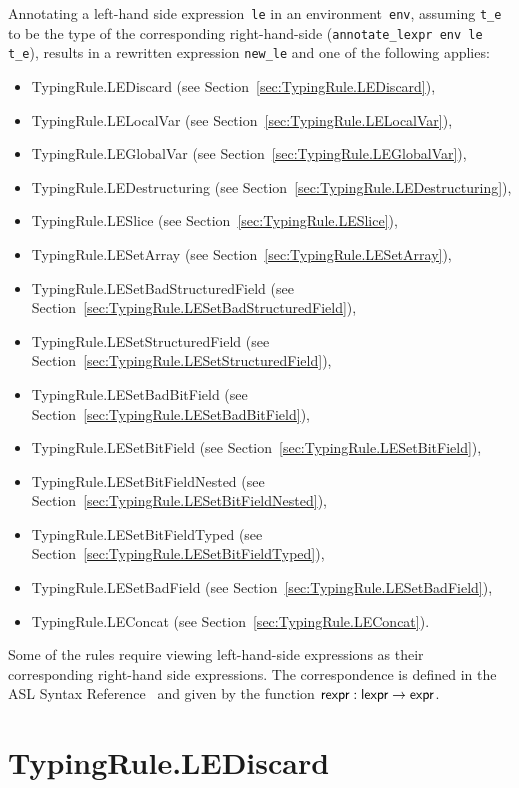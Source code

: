 \documentclass{book}
\begin{document}
Annotating a left-hand side expression~\texttt{le} in an environment~\texttt{env}, assuming \texttt{t\_e}
to be the type of the corresponding right-hand-side (\texttt{annotate\_lexpr env le t\_e}),
results in a rewritten expression \texttt{new\_le} and one of the following applies:
\begin{itemize}
\item TypingRule.LEDiscard (see Section~\ref{sec:TypingRule.LEDiscard}),
\item TypingRule.LELocalVar (see Section~\ref{sec:TypingRule.LELocalVar}),
\item TypingRule.LEGlobalVar (see Section~\ref{sec:TypingRule.LEGlobalVar}),
\item TypingRule.LEDestructuring (see Section~\ref{sec:TypingRule.LEDestructuring}),
\item TypingRule.LESlice (see Section~\ref{sec:TypingRule.LESlice}),
\item TypingRule.LESetArray (see Section~\ref{sec:TypingRule.LESetArray}),
\item TypingRule.LESetBadStructuredField (see Section~\ref{sec:TypingRule.LESetBadStructuredField}),
\item TypingRule.LESetStructuredField (see Section~\ref{sec:TypingRule.LESetStructuredField}),
\item TypingRule.LESetBadBitField (see Section~\ref{sec:TypingRule.LESetBadBitField}),
\item TypingRule.LESetBitField (see Section~\ref{sec:TypingRule.LESetBitField}),
\item TypingRule.LESetBitFieldNested (see Section~\ref{sec:TypingRule.LESetBitFieldNested}),
\item TypingRule.LESetBitFieldTyped (see Section~\ref{sec:TypingRule.LESetBitFieldTyped}),
\item TypingRule.LESetBadField (see Section~\ref{sec:TypingRule.LESetBadField}),
\item TypingRule.LEConcat (see Section~\ref{sec:TypingRule.LEConcat}).
\end{itemize}

Some of the rules require viewing left-hand-side expressions as their corresponding right-hand side expressions.
The correspondence is defined in the ASL Syntax Reference~\cite[Chapter 5]{ASLAbstractSyntaxReference}
and given by the function $\textsf{rexpr} : \textsf{lexpr} \rightarrow \textsf{expr}$.

\section{TypingRule.LEDiscard \label{sec:TypingRule.LEDiscard}}
\end{document}
